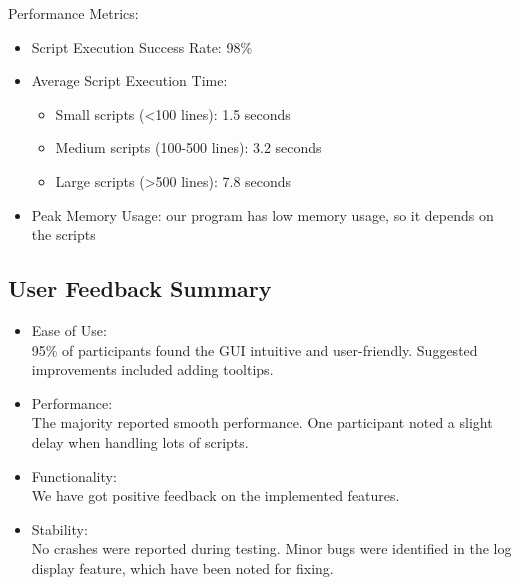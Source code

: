 \documentclass{article}
\begin{document}
\noindent Performance Metrics:
\begin{itemize}
    \item Script Execution Success Rate: 98\%
    \item Average Script Execution Time:
    \begin{itemize}
        \item Small scripts (<100 lines): 1.5 seconds
        \item Medium scripts (100-500 lines): 3.2 seconds
        \item Large scripts (>500 lines): 7.8 seconds
    \end{itemize}
    \item Peak Memory Usage: our program has low memory usage, so it depends on the scripts
\end{itemize}


\subsection{User Feedback Summary}
\begin{itemize}
    \item Ease of Use:\\
    95\% of participants found the GUI intuitive and user-friendly. Suggested improvements included adding tooltips.
    \item Performance:\\
    The majority reported smooth performance. One participant noted a slight delay when handling lots of scripts.
    \item Functionality:\\
    We have got positive feedback on the implemented features.
    \item Stability:\\
    No crashes were reported during testing. Minor bugs were identified in the log display feature, which have been noted for fixing.
\end{itemize}
\end{document}
